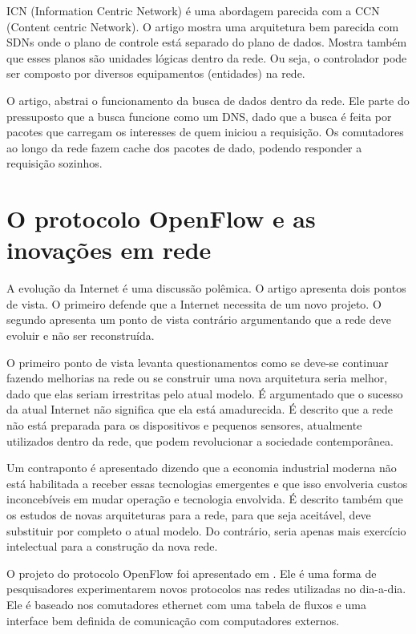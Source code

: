ICN (Information Centric Network) \citep{bong2009information} é uma abordagem
parecida com a CCN (Content centric Network).
O artigo mostra uma arquitetura bem parecida com SDNs onde o plano de controle
está separado do plano de dados. Mostra também que esses planos são unidades
lógicas dentro da rede. Ou seja, o controlador pode ser composto por diversos
equipamentos (entidades) na rede.

O artigo, abstrai o funcionamento da busca de dados dentro da rede.
Ele parte do pressuposto que a busca funcione como um DNS, dado que a busca é
feita por pacotes que carregam os interesses de quem iniciou a requisição.
Os comutadores ao longo da rede fazem cache dos pacotes de dado, podendo
responder a requisição sozinhos.

\section{O protocolo OpenFlow e as inovações em rede}

A evolução da Internet é uma discussão polêmica.
O artigo \citep{jennifer2010future} apresenta dois pontos de vista.
O primeiro defende que a Internet necessita de um novo projeto.
O segundo apresenta um ponto de vista contrário argumentando que a rede
deve evoluir e não ser reconstruída.

O primeiro ponto de vista levanta questionamentos como se deve-se continuar
fazendo melhorias na rede ou se construir uma nova arquitetura seria melhor,
dado que elas seriam irrestritas pelo atual modelo.
É argumentado que o sucesso da atual Internet não significa que
ela está amadurecida.
É descrito que a rede não está preparada para os dispositivos e
pequenos sensores, atualmente utilizados dentro da rede, que podem
revolucionar a sociedade contemporânea.

Um contraponto é apresentado dizendo que a economia industrial moderna não
está habilitada a receber essas tecnologias emergentes e que isso envolveria
custos inconcebíveis em mudar operação e tecnologia envolvida.
É descrito também que os estudos de novas arquiteturas para a rede, para que
seja aceitável, deve substituir por completo o atual modelo.
Do contrário, seria apenas mais exercício intelectual para a construção
da nova rede.

O projeto do protocolo OpenFlow foi apresentado em \citep{nick2008openflow}.
Ele é uma forma de pesquisadores experimentarem novos protocolos nas redes
utilizadas no dia-a-dia. Ele é baseado nos comutadores ethernet com uma tabela de
fluxos e uma interface bem definida de comunicação com computadores externos.

